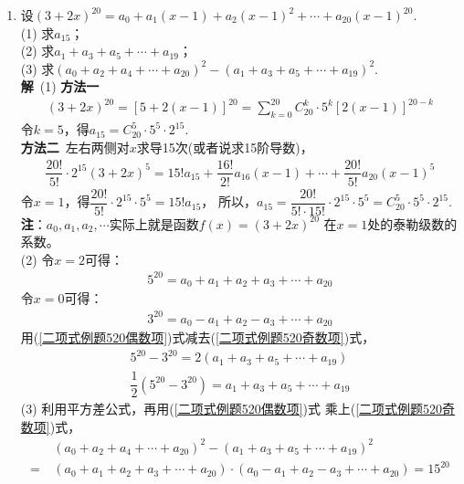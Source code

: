 \begin{enumerate}[label={【\textbf{例\thechapter.\arabic*}】},
 leftmargin=\inteval{\myenumleftmargin}pt,
 itemsep=\inteval{\myenumitempsep}pt,
 itemindent=\inteval{\myenumitemindent}pt]
\item 设$ (3+2x)^{20}=a_0+a_1(x-1)+a_2(x-1)^2+\cdots+a_{20}(x-1)^{20} $. \\
(1) 求$ a_{15} $；\\
(2) 求$ a_{1}+a_{3}+a_{5}+\cdots+a_{19} $；\\
(3) 求$ (a_{0}+a_{2}+a_{4}+\cdots+a_{20})^2-
(a_{1}+a_{3}+a_{5}+\cdots+a_{19})^2 $. \\
\textbf{解}\ (1) \textbf{方法一}
\begin{align*}
    (3+2x)^{20}=[5+2(x-1)]^{20}=
    \sum_{k=0}^{20}C_{20}^{k}\cdot 5^k[2(x-1)]^{20-k}
\end{align*}
令$ k=5 $，得$ a_{15}=C_{20}^5 \cdot 5^5\cdot 2^{15} $. \\
\textbf{方法二}\ 左右两侧对$ x $求导15次(或者说求15阶导数)，
\begin{align*}
    \dfrac{20!}{5!} \cdot 2^{15}(3+2x)^5= 15!a_{15}+
    \dfrac{16!}{2!}a_{16}(x-1)+\cdots+\dfrac{20!}{5!}a_{20}(x-1)^5
\end{align*}
令$ x=1 $，得$ \dfrac{20!}{5!} \cdot 2^{15}\cdot 5^5=15!a_{15} $，
所以，$ a_{15}=\dfrac{20!}{5!\cdot 15!}\cdot 2^{15}\cdot 5^5=
C_{20}^5 \cdot 5^5\cdot 2^{15} $. \\
\textbf{注}：$ a_0,a_1,a_2,\cdots $实际上就是函数$ f(x)=(3+2x)^{20} $
在$ x=1 $处的泰勒级数的系数。\\
(2) 令$ x=2 $可得：
\begin{gather} \label{二项式例题520偶数项}
    5^{20}=a_0+a_1+a_2+a_3+\cdots+a_{20}
\end{gather}
令$ x=0 $可得：
\begin{gather} \label{二项式例题520奇数项}
    3^{20}=a_0-a_1+a_2-a_3+\cdots+a_{20}
\end{gather}
用(\ref{二项式例题520偶数项})式减去(\ref{二项式例题520奇数项})式，
\begin{gather*}
    5^{20}-3^{20}=2(a_{1}+a_{3}+a_{5}+\cdots+a_{19}) \\
    \dfrac{1}{2}(5^{20}-3^{20})=a_{1}+a_{3}+a_{5}+\cdots+a_{19}
\end{gather*}
(3) 利用平方差公式，再用(\ref{二项式例题520偶数项})式
乘上(\ref{二项式例题520奇数项})式，
\begin{align*}
    &\ (a_{0}+a_{2}+a_{4}+\cdots+a_{20})^2-
    (a_{1}+a_{3}+a_{5}+\cdots+a_{19})^2 \\
    =&\ (a_0+a_1+a_2+a_3+\cdots+a_{20})\cdot 
    (a_0-a_1+a_2-a_3+\cdots+a_{20}) =15^{20}
\end{align*}


\end{enumerate}
